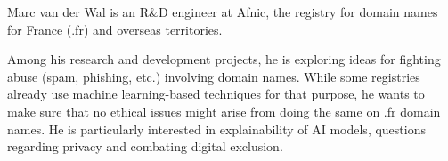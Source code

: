 \documentclass[journal]{IEEEtran}
\begin{document}
\begin{IEEEbiographynophoto}{Marc van der Wal}
  is an  R\&D engineer  at Afnic,  the registry  for domain  names for
  France (.fr) and overseas territories.

  Among his research and development projects, he is exploring ideas for
  fighting abuse (spam, phishing, etc.) involving domain names. While some
  registries already use machine learning-based techniques for that purpose,
  he wants to make sure that no ethical issues might arise from doing the same
  on .fr domain names. He is particularly interested in explainability of AI
  models, questions regarding privacy and combating digital exclusion.
\end{IEEEbiographynophoto}

\vfill
\end{document}
